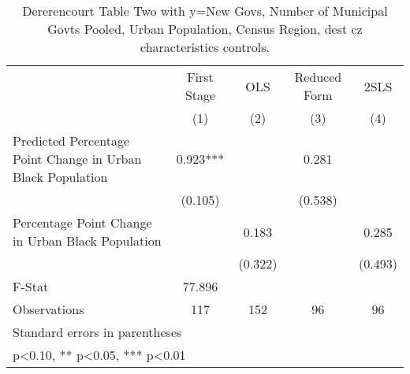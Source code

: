 \begin{table}[htbp]\centering
\def\sym#1{\ifmmode^{#1}\else\(^{#1}\)\fi}
\caption{Dererencourt Table Two with y=New Govs, Number of Municipal Govts  Pooled, Urban Population, Census Region, dest cz characteristics controls.}
\begin{tabular}{l*{4}{c}}
\toprule
                    & First Stage   &         OLS   &Reduced Form   &        2SLS   \\
                    &\multicolumn{1}{c}{(1)}   &\multicolumn{1}{c}{(2)}   &\multicolumn{1}{c}{(3)}   &\multicolumn{1}{c}{(4)}   \\
\midrule
Predicted Percentage Point Change in Urban Black Population&       0.923***&               &       0.281   &               \\
                    &     (0.105)   &               &     (0.538)   &               \\
\addlinespace
Percentage Point Change in Urban Black Population&               &       0.183   &               &       0.285   \\
                    &               &     (0.322)   &               &     (0.493)   \\
\midrule
F-Stat              &      77.896   &               &               &               \\
Observations        &         117   &         152   &          96   &          96   \\
\bottomrule
\multicolumn{5}{l}{\footnotesize Standard errors in parentheses}\\
\multicolumn{5}{l}{\footnotesize * p<0.10, ** p<0.05, *** p<0.01}\\
\end{tabular}
\end{table}
